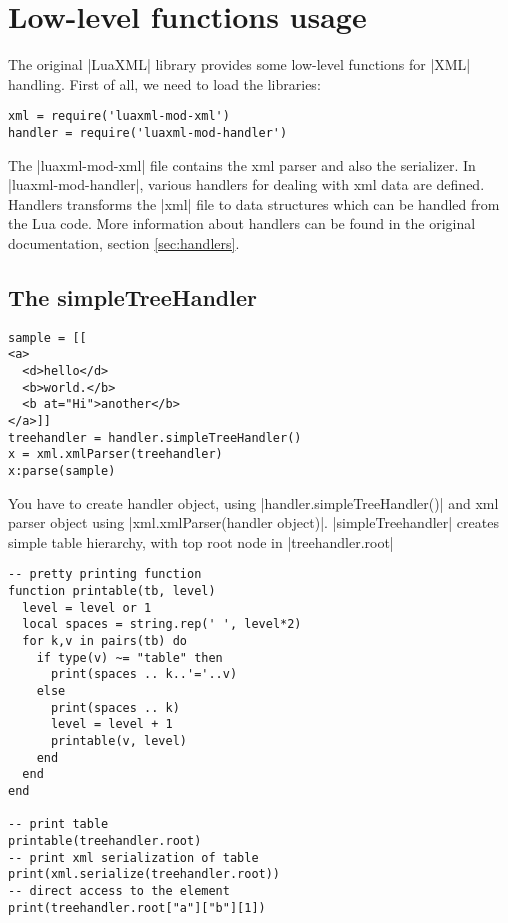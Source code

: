 \documentclass{ltxdoc}
\begin{document}



\section{Low-level functions usage}



The original |LuaXML| library provides some low-level functions for |XML| handling.
First of all, we need to load the libraries:

\begin{verbatim}
xml = require('luaxml-mod-xml')
handler = require('luaxml-mod-handler')
\end{verbatim} 


The |luaxml-mod-xml| file contains the  xml parser and also the serializer. In
|luaxml-mod-handler|, various handlers for dealing with xml data are defined.
Handlers transforms the |xml| file to data structures which can be handled from
the Lua code. More information about handlers can be found in the original
documentation, section \ref{sec:handlers}.

\subsection{The simpleTreeHandler} 
\begin{verbatim}
sample = [[
<a>
  <d>hello</d>
  <b>world.</b>
  <b at="Hi">another</b>
</a>]]
treehandler = handler.simpleTreeHandler()
x = xml.xmlParser(treehandler)
x:parse(sample)
\end{verbatim} 

You have to create handler object, using |handler.simpleTreeHandler()| and xml
parser object using |xml.xmlParser(handler object)|. |simpleTreehandler|
creates simple table hierarchy, with top root node in |treehandler.root|

\begin{verbatim}
-- pretty printing function
function printable(tb, level)
  level = level or 1
  local spaces = string.rep(' ', level*2)
  for k,v in pairs(tb) do
    if type(v) ~= "table" then
      print(spaces .. k..'='..v)
    else
      print(spaces .. k)
      level = level + 1
      printable(v, level)
    end
  end
end

-- print table
printable(treehandler.root)
-- print xml serialization of table
print(xml.serialize(treehandler.root))
-- direct access to the element
print(treehandler.root["a"]["b"][1])
\end{verbatim}
\end{document}
